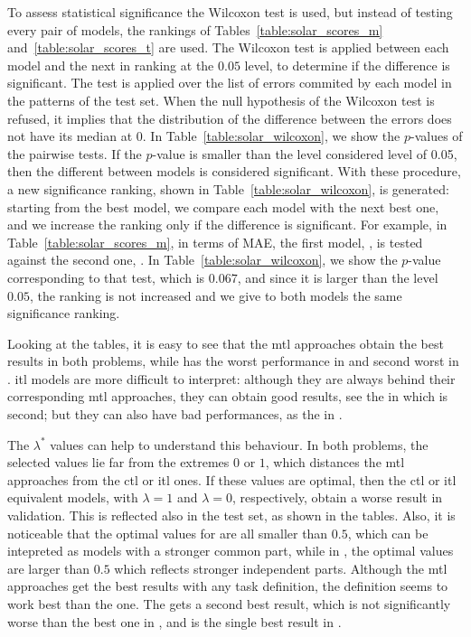 To assess statistical significance the Wilcoxon test is used, but instead of testing every pair of models, the rankings of Tables~\ref{table:solar_scores_m} and~\ref{table:solar_scores_t} are used. The Wilcoxon test is applied between each model and the next in ranking at the $0.05$ level, to determine if the difference is significant.
The test is applied over the list of errors commited by each model in the patterns of the test set. When the null hypothesis of the Wilcoxon test is refused, it implies that the distribution of the difference between the errors does not have its median at $0$.
In Table~\ref{table:solar_wilcoxon}, we show the $p$-values of the pairwise tests. If the $p$-value is smaller than the level considered level of 0.05, then the different between models is considered significant.
%
With these procedure, a new significance ranking, shown in Table~\ref{table:solar_wilcoxon},  is generated: starting from the best model, we compare each model with the next best one, and we increase the ranking only if the difference is significant.
%
For example, in Table~\ref{table:solar_scores_m}, in terms of MAE, the first model, , is tested against the second one, . In Table~\ref{table:solar_wilcoxon}, we show the $p$-value corresponding to that test, which is $0.067$, and since it is larger than the level $0.05$, the ranking is not increased and we give to both models the same significance ranking. 

%
Looking at the tables, it is easy to see that the \acrshort{mtl} approaches obtain the best results in both problems, while  has the worst performance in  and second worst in .
\acrshort{itl} models are more difficult to interpret: although they are always behind their corresponding \acrshort{mtl} approaches, they can obtain good results, see the  in  which is second; but they can also have bad performances, as the  in .

%
The $\lambda^*$ values can help to understand this behaviour. In both problems, the selected values lie far from the extremes $0$ or $1$, which distances the \acrshort{mtl} approaches from the \acrshort{ctl} or \acrshort{itl} ones. If these values are optimal, then the \acrshort{ctl} or \acrshort{itl} equivalent models, with $\lambda=1$ and $\lambda=0$, respectively, obtain a worse result in validation. This is reflected also in the test set, as shown in the tables.
Also, it is noticeable that the optimal values for  are all smaller than $0.5$, which can be intepreted as models with a stronger common part, while in , the optimal values are larger than $0.5$ which reflects stronger independent parts.
%
Although the \acrshort{mtl} approaches get the best results with any task definition, the  definition seems to work best than the  one. The  gets a second best result, which is not significantly worse than the best one in , and is the single best result in .


